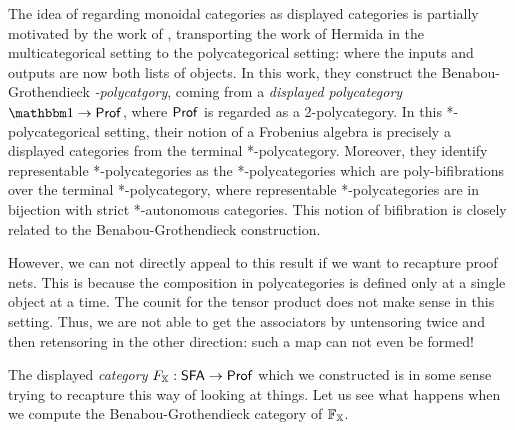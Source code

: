 The idea of regarding monoidal categories as displayed categories is partially motivated by the work of \cite{blanco}, transporting the work of Hermida in the multicategorical setting to the polycategorical setting:  where the inputs and outputs are now both lists of objects.  In this work, they construct the Benabou-Grothendieck {\em *-polycatgory}, coming from a {\em displayed polycategory} $\one\to \Prof$, where ${\sf Prof}$ is regarded as a 2-polycategory.  In this *-polycategorical setting, their notion of a Frobenius algebra is precisely  a displayed categories from the terminal *-polycategory.
Moreover, they identify representable *-polycategories as the  *-polycategories which are poly-bifibrations over the terminal *-polycategory, where representable *-polycategories are in bijection with strict *-autonomous categories.  This notion of bifibration is closely related to the Benabou-Grothendieck construction. 


However, we can not directly appeal to this result if we want to recapture proof nets.  This is because the composition in polycategories is defined only at a single object at a time. The counit for the tensor product does not make sense in this setting.  Thus, we are not able to get the associators by untensoring twice and then retensoring in the other direction:  such a map can not even be formed!

The displayed {\em category} $F_{\mathbb{X}}:{\sf SFA}\to {\sf Prof}$ which we constructed is in some sense trying to recapture this way of looking at things.  Let us see what happens when we compute the Benabou-Grothendieck category of $\mathbb{F}_{\mathbb{X}}$.

